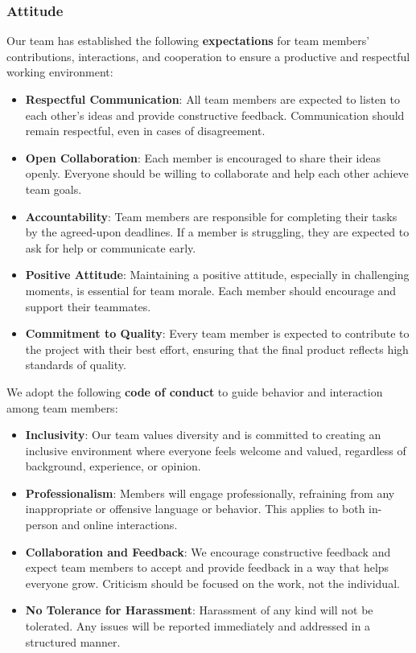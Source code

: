 \documentclass{article}
\begin{document}
\subsubsection*{\color{blue}Attitude}

Our team has established the following \textbf{expectations} for team
members' contributions, interactions, and cooperation to ensure a
productive and respectful working environment:

\begin{itemize}
  \item \textbf{Respectful Communication}: All team members are
    expected to listen to each other’s ideas and provide constructive
    feedback. Communication should remain respectful, even in cases
    of disagreement.
  \item \textbf{Open Collaboration}: Each member is encouraged to
    share their ideas openly. Everyone should be willing to
    collaborate and help each other achieve team goals.
  \item \textbf{Accountability}: Team members are responsible for
    completing their tasks by the agreed-upon deadlines. If a member
    is struggling, they are expected to ask for help or communicate early.
  \item \textbf{Positive Attitude}: Maintaining a positive attitude,
    especially in challenging moments, is essential for team morale.
    Each member should encourage and support their teammates.
  \item \textbf{Commitment to Quality}: Every team member is expected
    to contribute to the project with their best effort, ensuring
    that the final product reflects high standards of quality.
\end{itemize}

\noindent
We adopt the following \textbf{code of conduct} to guide behavior and
interaction among team members:

\begin{itemize}
  \item \textbf{Inclusivity}: Our team values diversity and is
    committed to creating an inclusive environment where everyone
    feels welcome and valued, regardless of background, experience, or opinion.
  \item \textbf{Professionalism}: Members will engage professionally,
    refraining from any inappropriate or offensive language or
    behavior. This applies to both in-person and online interactions.
  \item \textbf{Collaboration and Feedback}: We encourage
    constructive feedback and expect team members to accept and
    provide feedback in a way that helps everyone grow. Criticism
    should be focused on the work, not the individual.
  \item \textbf{No Tolerance for Harassment}: Harassment of any kind
    will not be tolerated. Any issues will be reported immediately
    and addressed in a structured manner.
\end{itemize}
\end{document}
